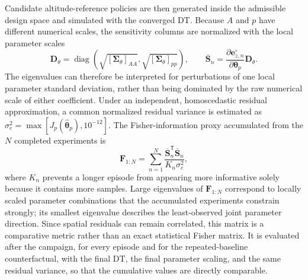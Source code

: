 \documentclass[journal]{IEEEtran}
\begin{document}
Candidate altitude-reference policies are then generated inside the admissible design space and simulated with the converged DT. Because $A$ and $p$ have different numerical scales, the sensitivity columns are normalized with the local parameter scales
\begin{equation}
 \mathbf D_{\theta}=\operatorname{diag}
 \left(\sqrt{[\boldsymbol{\Sigma}_{\theta}]_{AA}},
       \sqrt{[\boldsymbol{\Sigma}_{\theta}]_{pp}}\right),
 \qquad
 \overline{\mathbf S}_n=
 \frac{\partial\mathbf e_{z,n}^{\circ}}
 {\partial\boldsymbol{\theta}_p}\mathbf D_{\theta}.
\end{equation}
The eigenvalues can therefore be interpreted for perturbations of one local parameter standard deviation, rather than being dominated by the raw numerical scale of either coefficient. Under an independent, homoscedastic residual approximation, a common normalized residual variance is estimated as $\sigma_e^2=\max[J_p(\widehat{\boldsymbol{\theta}}_p),10^{-12}]$. The Fisher-information proxy accumulated from the $N$ completed experiments is
\begin{equation}
 \mathbf F_{1:N}=
 \sum_{n=1}^{N}
 \frac{\overline{\mathbf S}_n^{\mathsf T}\overline{\mathbf S}_n}
 {K_n\sigma_e^2},
 \label{eq:cumulative-fisher}
\end{equation}
where $K_n$ prevents a longer episode from appearing more informative solely because it contains more samples. Large eigenvalues of $\mathbf F_{1:N}$ correspond to locally scaled parameter combinations that the accumulated experiments constrain strongly; its smallest eigenvalue describes the least-observed joint parameter direction. Since spatial residuals can remain correlated, this matrix is a comparative metric rather than an exact statistical Fisher matrix. It is evaluated after the campaign, for every episode and for the repeated-baseline counterfactual, with the final DT, the final parameter scaling, and the same residual variance, so that the cumulative values are directly comparable.
\end{document}
